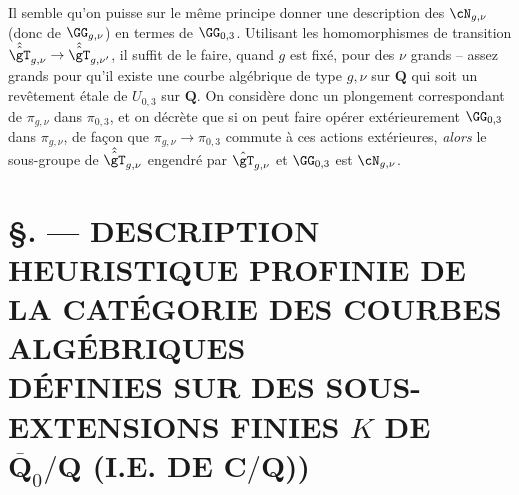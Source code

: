 Il semble qu'on puisse sur le même principe donner une description
des $\cN_{g,\nu}$ (donc de $\GG_{g,\nu}$) en termes de $\GG_{0,3}$.
Utilisant les homomorphismes de transition $\hat{\hat\gT}_{g,\nu}
\to\hat{\hat\gT}_{g,\nu'}$, il suffit de le faire, quand
$g$ est fixé, pour des $\nu$ grands -- assez grands pour qu'il
existe une courbe algébrique de type $g,\nu$ sur $\mathbf{Q}$
qui soit un revêtement étale de $U_{0,3}$ sur $\mathbf{Q}$.
On considère donc un plongement correspondant de $\pi_{g,\nu}$
dans $\pi_{0,3}$, et on décrète que si on peut faire opérer 
extérieurement $\GG_{0,3}$ dans $\pi_{g,\nu}$, de fa\c con que
$\pi_{g,\nu}\to\pi_{0,3}$ commute à ces actions extérieures,
{\it alors} le sous-groupe de $\hat{\hat\gT}_{g,\nu}$ engendré
par $\hat\gT_{g,\nu}$ et $\GG_{0,3}$ est $\cN_{g,\nu}$.















\chapter*{\S {}. --- DESCRIPTION HEURISTIQUE PROFINIE DE LA CATÉGORIE DES COURBES ALGÉBRIQUES \\ DÉFINIES SUR DES SOUS-EXTENSIONS FINIES $K$ DE $\overline{\mathbf{Q}}_0/{\mathbf{Q}}$ (I.E. DE ${\mathbf{C}}/{\mathbf{Q}}$))}\thispagestyle{empty}
\label{sec:34}
\section*{}


